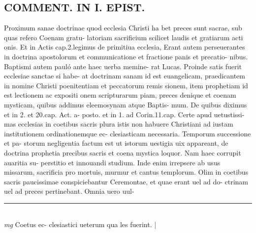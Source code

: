 \documentclass{article}
\begin{document}
\begin{pages}
\section*{COMMENT. IN I. EPIST. }\pstart Proximum sanae doctrinae quod ecclesia Christi ha bet preces sunt sacrae, sub quas refero Coenam gratu- latoriam sacrificium scilicet laudis et gratiarum acti onis. Et in Actis cap.2.legimus de primitiua ecclesia, Erant autem perseuerantes in doctrina apostolorum et communicatione et fractione panis et precatio- nibus. Baptismi autem pauló ante haec uerba memine- rat Lucas. Proinde satis fuerit ecclesiae sanctae si habe- at doctrinam sanam id est euangelicam, praedicantem in nomine Christi poenitentiam et peccatorum remis sionem, item prophetiam id est lectionem ac expositi onem scripturarum piam, preces denique et coenam mysticam, quibus addimus eleemosynam atque Baptis- mum. De quibus diximus et in 2. et 20.cap. Act. a- posto. et in 1. ad Corin.11.cap. Certe apud uetustissi- mas ecclesias in coetibus sacris plura istis non habuere Christiani ad iustam institutionem ordinationemque ec- clesiasticam necessaria. Temporum successione et pa- storum negligentia factum est ut istorum uestigia uix appareant, de doctrina prophetia precibus sacris et coena mystica loquor. Nam haec corrupit auaritia su- perstitio et innouandi studium. Inde enim irrepsere ab usus missarum, sacrificia pro mortuis, murmur et cantus templorum. Olim in coetibus sacris paucissimae conspiciebantur Ceremontae, et quae erant uel ad do- ctrinam uel ad preces pertinebant. Omnia uero uul-  \pend
\vspace{0.5cm}\noindent
\vspace{0.2cm}\rule{1cm}{0.2pt}\\ 
\hspace{0.2cm}\textit{mg}
\footnotesize Coetus ec- clesiastici ueterum qua les fuerint. 
\normalsize| 

\end{pages}
\end{document}
